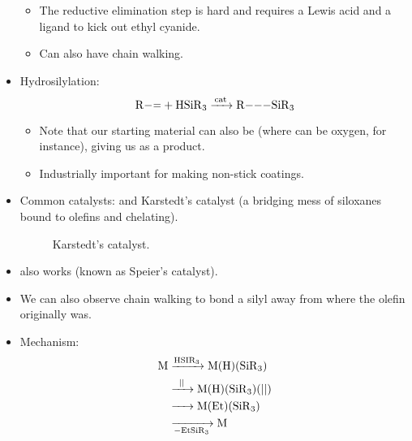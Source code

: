 \documentclass[../notes.tex]{subfiles}
\begin{document}
\begin{itemize}
\begin{itemize}
        \item The reductive elimination step is hard and requires a Lewis acid and a ligand to kick out ethyl cyanide.
        \item Can also have chain walking.
    \end{itemize}
    \item Hydrosilylation:
    \begin{equation*}
        \ce{R-= + HSiR3 ->[{cat}] R---SiR3}
    \end{equation*}
    \begin{itemize}
        \item Note that our starting material can also be  (where  can be oxygen, for instance), giving us  as a product.
        \item Industrially important for making non-stick coatings.
    \end{itemize}
    \item Common catalysts:  and Karstedt's catalyst (a bridging mess of siloxanes bound to olefins and chelating).
    \begin{figure}[h!]
        \centering
        \caption{Karstedt's catalyst.}
        \label{fig:karstedtCatalyst}
    \end{figure}
    \item {} also works (known as Speier's catalyst).
    \item We can also observe chain walking to bond a silyl away from where the olefin originally was.
    \item Mechanism:
    \begin{align*}
        \ce{M} &\ce{->[HSIR3]} \ce{M(H)(SiR3)}\\
        &\ce{->[||]} \ce{M(H)(SiR3)(||)}\\
        &\ce{->} \ce{M(Et)(SiR3)}\\
        &\ce{->[][-EtSiR3]} \ce{M}
    \end{align*}
    \begin{itemize}

\end{itemize}
\end{itemize}
\end{document}
